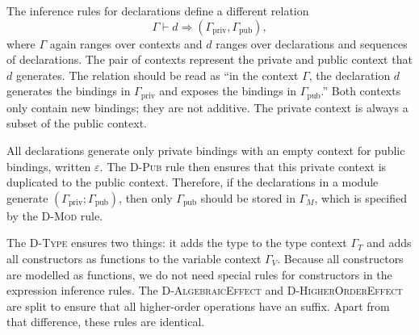 The inference rules for declarations define a different relation
\[ \Gamma \vdash d \Rightarrow (\Gamma_{\text{priv}}, \Gamma_{\text{pub}}), \]
where $\Gamma$ again ranges over contexts and $d$ ranges over declarations and sequences of declarations. The pair of contexts represent the private and public context that $d$ generates. The relation should be read as ``in the context $\Gamma$, the declaration $d$ generates the bindings in $\Gamma_{\text{priv}}$ and exposes the bindings in $\Gamma_{\text{pub}}$.'' Both contexts only contain new bindings; they are not additive. The private context is always a subset of the public context.

All declarations generate only private bindings with an empty context for public bindings, written $\varepsilon$. The \textsc{D-Pub} rule then ensures that this private context is duplicated to the public context. Therefore, if the declarations in a module generate $(\Gamma_{\text{priv}};\Gamma_{\text{pub}})$, then only $\Gamma_{\text{pub}}$ should be stored in $\Gamma_M$, which is specified by the \textsc{D-Mod} rule.

The \textsc{D-Type} ensures two things: it adds the type to the type context $\Gamma_T$ and adds all constructors as functions to the variable context $\Gamma_V$. Because all constructors are modelled as functions, we do not need special rules for constructors in the expression inference rules. The \textsc{D-AlgebraicEffect} and \textsc{D-HigherOrderEffect} are split to ensure that all higher-order operations have an \el{!} suffix. Apart from that difference, these rules are identical.

\setlength{\fboxsep}{2\fboxsep}

